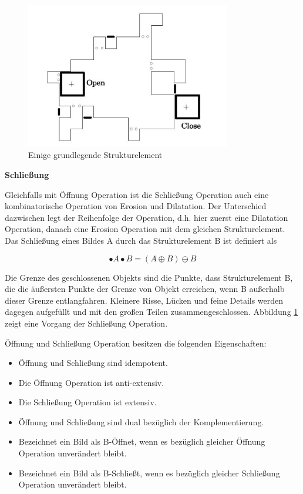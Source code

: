 \begin{figure}[htb]
 \centering 
  \includegraphics[keepaspectratio,width=0.8\textwidth]{images/4_ZweiteErfahrung/Morphological/oeffnungundschliessung.pdf}
 \caption{Einige grundlegende Strukturelement}
 \label{fig:oeffnungundschliessung}
\end{figure} 

\textbf{Schließung}

Gleichfalls mit Öffnung Operation ist die Schließung Operation auch eine kombinatorische Operation von Erosion und Dilatation. Der Unterschied dazwischen legt der Reihenfolge der Operation, d.h. hier zuerst eine Dilatation Operation, danach eine Erosion Operation mit dem gleichen Strukturelement. Das Schließung eines Bildes A durch das Strukturelement B ist definiert als

\begin{equation}
•A \bullet B =( A \oplus B )\ominus B  
\end{equation}

Die Grenze des geschlossenen Objekts sind die Punkte, dass Strukturelement B, die die äußersten Punkte der Grenze von Objekt erreichen, wenn B außerhalb dieser Grenze entlangfahren. Kleinere Risse, Lücken und feine Details werden dagegen aufgefüllt und mit den großen Teilen zusammengeschlossen. Abbildung \ref{fig:oeffnungundschliessung} zeigt eine Vorgang der Schließung Operation.


Öffnung und Schließung Operation besitzen die folgenden Eigenschaften:

\begin{itemize}

\item Öffnung und Schließung sind idempotent.
\item Die Öffnung Operation ist anti-extensiv. 
\item Die Schließung Operation ist extensiv.
\item Öffnung und Schließung sind dual bezüglich der Komplementierung.
\item Bezeichnet ein Bild als B-Öffnet, wenn es bezüglich gleicher Öffnung Operation unverändert bleibt. 
\item Bezeichnet ein Bild als B-Schließt, wenn es bezüglich gleicher Schließung Operation unverändert bleibt. 

\end{itemize}


